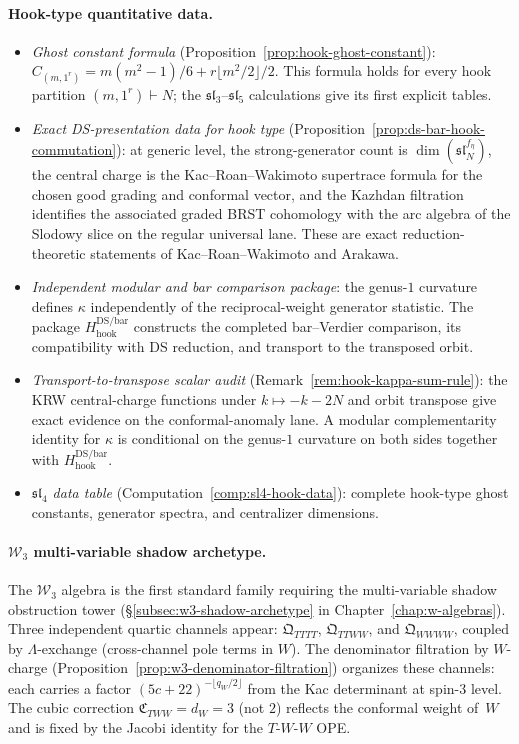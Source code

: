\paragraph{Hook-type quantitative data.}
\begin{itemize}
\item \emph{Ghost constant formula}
 (Proposition~\ref{prop:hook-ghost-constant}):
 $C_{(m,1^r)} = m(m^2-1)/6 + r\lfloor m^2/2\rfloor/2$.
 This formula holds for every hook partition
 $(m,1^r)\vdash N$; the $\mathfrak{sl}_3$--$\mathfrak{sl}_5$
 calculations give its first explicit tables.
\item \emph{Exact DS-presentation data for hook type}
 (Proposition~\ref{prop:ds-bar-hook-commutation}):
 at generic level, the strong-generator count is
 $\dim(\mathfrak{sl}_N^{f_\eta})$, the central charge is the
 Kac--Roan--Wakimoto supertrace formula for the chosen good grading
 and conformal vector, and the Kazhdan filtration identifies the
 associated graded BRST cohomology with the arc algebra of the
 Slodowy slice on the regular universal lane.  These are exact
 reduction-theoretic statements of Kac--Roan--Wakimoto and Arakawa.
\item \emph{Independent modular and bar comparison package}:
 the genus-$1$ curvature defines $\kappa$ independently of the
 reciprocal-weight generator statistic.  The package
 $H_{\mathrm{hook}}^{\mathrm{DS/bar}}$ constructs the completed
 bar--Verdier comparison, its compatibility with DS reduction, and
 transport to the transposed orbit.
\item \emph{Transport-to-transpose scalar audit}
 (Remark~\ref{rem:hook-kappa-sum-rule}):
 the KRW central-charge functions under
 $k\mapsto-k-2N$ and orbit transpose give exact evidence on the
 conformal-anomaly lane.  A modular complementarity identity for
 $\kappa$ is conditional on the genus-$1$ curvature on both sides
 together with $H_{\mathrm{hook}}^{\mathrm{DS/bar}}$.
\item \emph{$\mathfrak{sl}_4$ data table}
 (Computation~\ref{comp:sl4-hook-data}): complete hook-type
 ghost constants, generator spectra, and centralizer dimensions.
\end{itemize}

\paragraph{$\mathcal{W}_3$ multi-variable shadow archetype.}
The $\mathcal{W}_3$ algebra is the first standard family requiring
the multi-variable shadow obstruction tower
(\S\ref{subsec:w3-shadow-archetype} in
Chapter~\ref{chap:w-algebras}). Three independent quartic
channels appear: $\mathfrak{Q}_{TTTT}$, $\mathfrak{Q}_{TTWW}$,
and $\mathfrak{Q}_{WWWW}$, coupled by $\Lambda$-exchange
(cross-channel pole terms in $W$). The denominator filtration
by $W$-charge
(Proposition~\ref{prop:w3-denominator-filtration}) organizes
these channels: each carries a factor
$(5c+22)^{-\lfloor q_W/2 \rfloor}$ from the Kac determinant
at spin-$3$ level. The cubic correction
$\mathfrak{C}_{TWW} = d_W = 3$ (not $2$) reflects the
conformal weight of~$W$ and is fixed by the Jacobi identity
for the $T$-$W$-$W$ OPE.

